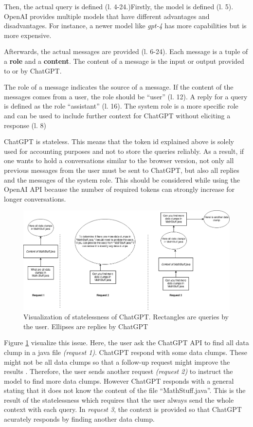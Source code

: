 Then, the actual query is defined (l. 4-24.)Firstly, the model is defined (l. 5). OpenAI provides multiple models that have different advantages and disadvantages. For instance, a newer model like \textit{gpt-4} has more capabilities but is more expensive. 

Afterwards, the actual messages are provided (l. 6-24). Each message is a tuple of a \textbf{role} and a \textbf{content}. The content of a message is the input or output provided to or by ChatGPT. 

The role of a message indicates the source of a message. If the content of the messages comes from a user, the role should be \enquote{user} (l. 12). A reply for a query is defined as the role \enquote{assistant} (l. 16). The system role is a more specific role and can be used to include further context for ChatGPT without eliciting a response (l. 8)

ChatGPT is stateless. This means that the token id explained above is solely used for accounting purposes and not to store the queries reliably. As a result, if one wants to hold a conversations similar to the browser version,  not only all previous messages from the user must be sent to ChatGPT, but also all replies and the messages of the system role. This should be considered while using the OpenAI \ac{API} because the number of required tokens can strongly increase for longer conversations.

\begin{figure}
    \centering
    \includegraphics[width=\columnwidth]{figures/chapter2/chatgpt_stateless.png}
    \caption{Visualization of statelessness of ChatGPT. Rectangles are queries by the user. Ellipses are replies by ChatGPT}
    \label{fig:chatgpt_stateless}
\end{figure}


Figure \ref{fig:chatgpt_stateless} visualize this issue. Here, the user ask the ChatGPT API to find all data clump in a java file \textit{(request 1)}. ChatGPT respond with some data clumps. These might not be all data clumps so that a follow-up request might improve the results \cite{10062688}. Therefore, the user sends another request \textit{(request 2)} to instruct the model to find more data clumps. However ChatGPT responds with a general stating that it does not know the content of the file \enquote{MathStuff.java}. This is the result of the statelessness which requires that the user always send the whole context with each query. In \textit{request 3}, the context is provided so that ChatGPT acurately responds by finding another data clump.

